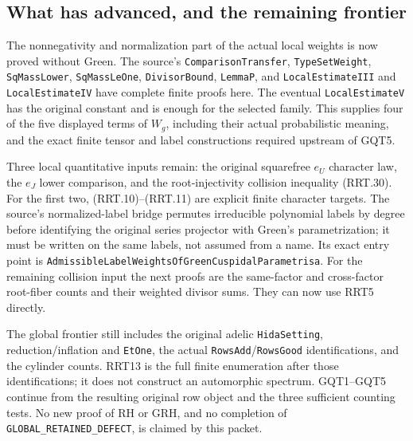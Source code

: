 \subsection{What has advanced, and the remaining frontier}

The nonnegativity and normalization part of the actual local
weights is now proved without Green.  The source's
\texttt{ComparisonTransfer}, \texttt{TypeSetWeight},
\texttt{SqMassLower}, \texttt{SqMassLeOne},
\texttt{DivisorBound}, \texttt{LemmaP}, and
\texttt{LocalEstimateIII} and \texttt{LocalEstimateIV} have
complete finite proofs here.
The eventual \texttt{LocalEstimateV} has the original constant
and is enough for the selected family.  This supplies four of
the five displayed terms of $W_g$, including their actual
probabilistic meaning, and the exact finite tensor and label
constructions required upstream of GQT5.

Three local quantitative inputs remain: the original
squarefree $e_U$ character law, the $e_J$ lower comparison,
and the root-injectivity collision inequality (RRT.30).
For the first two, (RRT.10)--(RRT.11) are explicit finite
character targets.  The source's normalized-label bridge
permutes irreducible polynomial labels by degree before
identifying the original series projector with Green's
parametrization; it must be written on the same labels, not
assumed from a name.  Its exact entry point is
\texttt{AdmissibleLabelWeightsOfGreenCuspidalParametrisa}.
For the remaining collision input the next proofs are the
same-factor and cross-factor root-fiber counts and their
weighted divisor sums.  They can now use RRT5 directly.

The global frontier still includes the original adelic
\texttt{HidaSetting}, reduction/inflation and \texttt{EtOne},
the actual \texttt{RowsAdd}/\texttt{RowsGood} identifications,
and the cylinder counts.  RRT13 is the full finite enumeration
after those identifications; it does not construct an
automorphic spectrum.  GQT1--GQT5 continue from the resulting
original row object and the three sufficient counting tests.
No new proof of RH or GRH, and no completion of
\texttt{GLOBAL\_RETAINED\_DEFECT}, is claimed by this packet.
